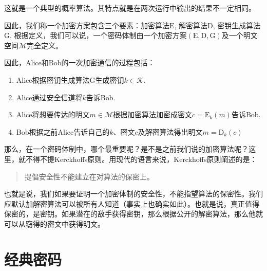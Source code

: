 \documentclass[UTF8]{ctexrep}
\def\pth#1{\left( {#1}\right)}
\def\E#1#2{{\mathrm{E}_{#1}\left({#2}\right)}}
\def\D#1#2{{\mathrm{D}_{#1}\left({#2}\right)}}
\begin{document}
这就是一个典型的概率算法。其特点就是在两次运行中输出的结果不一定相同。\par
因此，我们称一个加密方案包含三个要素：加密算法$\mathrm{E}$, 解密算法$\mathrm{D}$, 密钥生成算法$\mathrm{G}$. 根据定义，我们可以说，一个密码体制由一个加密方案$\pth{\mathrm{E}, \mathrm{D}, \mathrm{G}}$及一个明文空间$\mathcal{M}$完全定义。\par
因此，Alice和Bob的一次加密通信的过程包括：
\begin{enumerate}
    \item Alice根据密钥生成算法$\mathrm{G}$生成密钥$k\in\mathcal{K}$.
    \item Alice通过安全信道将$k$告诉Bob.
    \item Alice将想要传达的明文$m\in\mathcal{M}$根据加密算法加密成密文$c=\E{k}{m}$告诉Bob.
    \item Bob根据之前Alice告诉自己的$k$、密文$c$及解密算法得出明文$m=\D{k}{c}$
\end{enumerate}

那么，在一个密码体制中，哪个最重要呢？是不是之前我们说的加密算法呢？这里，就不得不提Kerckhoffs原则。用现代的语言来说，Kerckhoffs原则阐述的是：
\begin{quote}
    提倡安全性不能建立在对算法的保密上。
\end{quote}

也就是说，我们如果要证明一个加密体制的安全性，不能指望算法的保密性。我们应默认加解密算法可以被所有人知道（事实上也确实如此）。也就是说，真正值得保密的，是密钥。如果潜在的敌手获得密钥，那么根据公开的解密算法，那么他就可以从窃得的密文中获得明文。
\section{经典密码}
\end{document}
